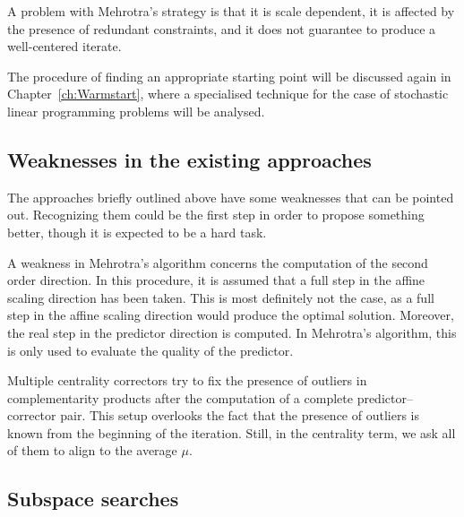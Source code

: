 A problem with Mehrotra's strategy is that it is scale dependent,
it is affected by the presence of redundant constraints,
and it does not guarantee to produce a well-centered iterate.

The procedure of finding an appropriate starting point will be discussed
again in Chapter~\ref{ch:Warmstart}, where a specialised technique for
the case of stochastic linear programming problems will be analysed.

%
%
\subsection{Weaknesses in the existing approaches}

The approaches briefly outlined above have some weaknesses that 
can be pointed out. Recognizing them could be the first step in 
order to propose something better, though it is expected to be a 
hard task.

A weakness in Mehrotra's algorithm concerns the computation of the 
second order direction. In this procedure, it is assumed that a 
full step in the affine scaling direction has been taken. This is 
most definitely not the case, as a full step in the affine scaling 
direction would produce the optimal solution. Moreover, the real 
step in the predictor direction is computed. In Mehrotra's algorithm, 
this is only used to evaluate the quality of the predictor.

Multiple centrality correctors try to fix the presence of outliers in 
complementarity products after the computation of a complete 
predictor--corrector pair. This setup overlooks the fact that the 
presence of outliers is known from the beginning of the iteration. 
Still, in the centrality term,  we ask all of them to align to the 
average $\mu$.

%
%
\subsection{Subspace searches}



